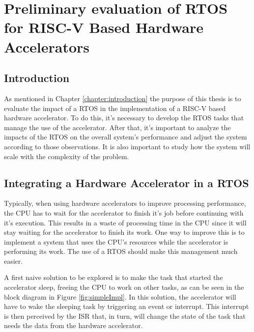 \chapter{Preliminary evaluation of RTOS for RISC-V Based Hardware Accelerators}
\label{chapter:PreliminaryWork}
\section{Introduction}
As mentioned in Chapter \ref{chapter:introduction} the purpose of this thesis is to evaluate the impact of a RTOS in the implementation of a RISC-V based hardware accelerator. To do this, it's necessary to develop the RTOS tasks that manage the use of the accelerator. After that, it's important to analyze the impacts of the RTOS on the overall system's performance and adjust the system according to those observations. It is also important to study how the system will scale with the complexity of the problem.



\section{Integrating a Hardware Accelerator in a RTOS}
Typically, when using hardware accelerators to improve processing performance, the CPU has to wait for the accelerator to finish it's job before continuing with it's execution. This results in a waste of processing time in the CPU since it will stay waiting for the accelerator to finish its work. One way to improve this is to implement a system that uses the CPU's resources while the accelerator is performing its work. The use of a RTOS should make this management much easier.

A first naive solution to be explored is to make the task that started the accelerator sleep, freeing the CPU to work on other tasks, as can be seen in the block diagram in Figure \ref{fig:simpleImpl}. In this solution, the accelerator will have to wake the sleeping task by triggering an event or interrupt. This interrupt is then perceived by the ISR that, in turn, will change the state of the task that needs the data from the hardware accelerator.

